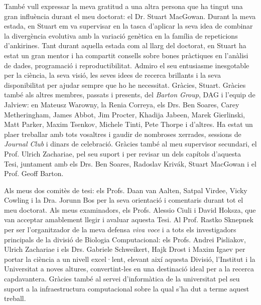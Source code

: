 També vull expressar la meva gratitud a una altra persona que ha tingut una gran influència durant el meu doctorat: el Dr. Stuart MacGowan. Durant la meva estada, en Stuart em va supervisar en la tasca d'aplicar la seva idea de combinar la divergència evolutiva amb la variació genètica en la família de repeticions d'ankirines. Tant durant aquella estada com al llarg del doctorat, en Stuart ha estat un gran mentor i ha compartit consells sobre bones pràctiques en l'anàlisi de dades, programació i reproductibilitat. Admiro el seu entusiasme inesgotable per la ciència, la seva visió, les seves idees de recerca brillants i la seva disponibilitat per ajudar sempre que ho he necessitat. Gràcies, Stuart. Gràcies també als altres membres, passats i presents, del \textit{Barton Group}, DAG i l'equip de Jalview: en Mateusz Warowny, la Renia Correya, els Drs. Ben Soares, Carey Metheringham, James Abbot, Jim Procter, Khadija Jabeen, Marek Gierlinski, Matt Parker, Maxim Tsenkov, Michele Tinti, Pete Thorpe i d'altres. Ha estat un plaer treballar amb tots vosaltres i gaudir de nombroses xerrades, sessions de \textit{Journal Club} i dinars de celebració. Gràcies també al meu supervisor secundari, el Prof. Ulrich Zachariae, pel seu suport i per revisar un dels capítols d'aquesta Tesi, juntament amb els Drs. Ben Soares, Radoslav Krivák, Stuart MacGowan i el Prof. Geoff Barton.

Als meus dos comitès de tesi: els Profs. Daan van Aalten, Satpal Virdee, Vicky Cowling i la Dra. Jorunn Bos per la seva orientació i comentaris durant tot el meu doctorat. Als meus examinadors, els Profs. Alessio Ciuli i David Hoksza, que van acceptar amablement llegir i avaluar aquesta Tesi. Al Prof. Rastko Sknepnek per ser l'organitzador de la meva defensa \textit{viva voce} i a tots els investigadors principals de la divisió de Biologia Computacional: els Profs. Andrei Pisliakov, Ulrich Zachariae i els Drs. Gabriele Schweikert, Hajk Drost i Maxim Igaev per portar la ciència a un nivell excel·lent, elevant així aquesta Divisió, l'Institut i la Universitat a noves altures, convertint-les en una destinació ideal per a la recerca capdavantera. Gràcies també al servei d'informàtica de la universitat pel seu suport a la infraestructura computacional sobre la qual s'ha dut a terme aquest treball.

